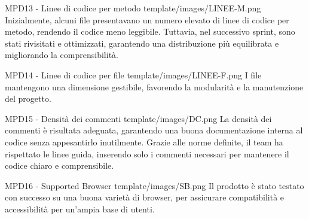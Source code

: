 \MetNoPB
{ %
    MPD13 -  Linee di codice per metodo
}
{ %
    template/images/LINEE-M.png
}
{   %
Inizialmente, alcuni file presentavano un numero elevato di linee di codice per metodo, rendendo il codice meno leggibile. Tuttavia, nel successivo sprint, sono stati rivisitati e ottimizzati, garantendo una distribuzione più equilibrata e migliorando la comprensibilità.
}

\MetNoPB
{ %
    MPD14 -  Linee di codice per file
}
{ %
    template/images/LINEE-F.png
}
{   %
    I file mantengono una dimensione gestibile, favorendo la modularità e la manutenzione del progetto.
}

\MetNoPB
{ %
    MPD15 -  Densità dei commenti
}
{ %
    template/images/DC.png
}
{   %
    La densità dei commenti è risultata adeguata, garantendo una buona documentazione interna al codice senza appesantirlo inutilmente. Grazie alle norme definite, il team ha rispettato le linee guida, inserendo solo i commenti necessari per mantenere il codice chiaro e comprensibile.
}

\MetNoPB
{ %
    MPD16 -  Supported Browser
}
{ %
    template/images/SB.png
}
{   %
    Il prodotto è stato testato con successo su una buona varietà di browser, per assicurare compatibilità e accessibilità per un’ampia base di utenti.
}
